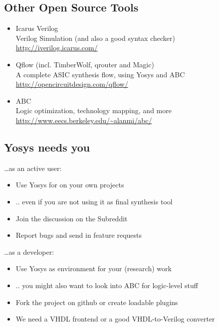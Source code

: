 
\subsection{Other Open Source Tools}

\begin{frame}{\subsecname}
\begin{itemize}
\item Icarus Verilog \\
\smallskip\hskip1cm{}Verilog Simulation (and also a good syntax checker) \\
\smallskip\hskip1cm{}\url{http://iverilog.icarus.com/}

\bigskip
\item Qflow (incl. TimberWolf, qrouter and Magic) \\
\smallskip\hskip1cm{}A complete ASIC synthesis flow, using Yosys and ABC \\
\smallskip\hskip1cm{}\url{http://opencircuitdesign.com/qflow/}

\bigskip
\item ABC \\
\smallskip\hskip1cm{}Logic optimization, technology mapping, and more \\
\smallskip\hskip1cm{}\url{http://www.eecs.berkeley.edu/~alanmi/abc/}
\end{itemize}
\end{frame}


\subsection{Yosys needs you}

\begin{frame}{\subsecname}
\dots as an active user:
\begin{itemize}
\item Use Yosys for on your own projects
\item .. even if you are not using it as final synthesis tool
\item Join the discussion on the Subreddit
\item Report bugs and send in feature requests
\end{itemize}

\bigskip
\dots as a developer:
\begin{itemize}
\item Use Yosys as environment for your (research) work
\item .. you might also want to look into ABC for logic-level stuff
\item Fork the project on github or create loadable plugins
\item We need a VHDL frontend or a good VHDL-to-Verilog converter
\end{itemize}
\end{frame}

